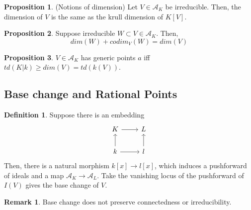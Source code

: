 \documentclass{article}
\theoremstyle{definition}
\theoremstyle{definition}
\newtheorem{definition}{Definition}[theorem]
\theoremstyle{definition}
\newtheorem{remark}{Remark}[theorem]
\theoremstyle{definition}
\newtheorem{proposition}{Proposition}[theorem]
\theoremstyle{definition}
\theoremstyle{definition}
\theoremstyle{definition}
\begin{document}
\begin{tcolorbox}[colback=blue!5!white,colframe=blue!30!white]
\begin{proposition}
(Notions of dimension) Let $V\in \mathcal{A}_K$ be irreducible. Then, the dimension of $V$ is the same as the krull dimension of $K[V]$. 
\end{proposition}
\end{tcolorbox}


\begin{tcolorbox}[colback=blue!5!white,colframe=blue!30!white]
\begin{proposition}
Suppose irreducible $W\subset V\in \mathcal{A}_K$. Then, 
\[dim(W)+codim_V(W)=dim(V)\] 
\end{proposition}
\end{tcolorbox}


\begin{tcolorbox}[colback=blue!5!white,colframe=blue!30!white]
\begin{proposition}
$V\in \mathcal{A}_K$ has generic points $a$ iff $td(K|k)\geq dim(V)=td(k(V))$. 
\end{proposition}
\end{tcolorbox}

\subsection{ Base change and Rational Points}

\begin{tcolorbox}[colback=purple!5!white,colframe=purple!75!black]
\begin{definition}
Suppose there is an embedding 
\[\begin{tikzcd}
K\arrow[r]&L\\
k\arrow[u]\arrow[r]&l\arrow[u]
\end{tikzcd}\]
Then, there is a natural morphism $k[x]\to l[x]$, which induces a pushforward of ideals and a map $\mathcal{A}_K\to \mathcal{A}_L$. Take the vanishing locus of the pushforward of $I(V)$ gives the base change of $V$. 


\end{definition}
\end{tcolorbox}

\begin{tcolorbox}[colback=green!5!white,colframe=green!30!white]
\begin{remark}
Base change does not preserve connectedness or irreducibility.
\end{remark}
\end{tcolorbox}
\end{document}
